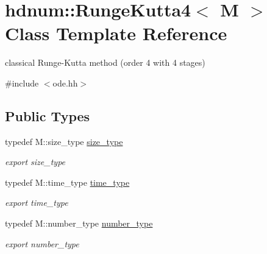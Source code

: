 \hypertarget{classhdnum_1_1RungeKutta4}{
\section{hdnum::RungeKutta4$<$ M $>$ Class Template Reference}
\label{classhdnum_1_1RungeKutta4}
}


classical Runge-\/Kutta method (order 4 with 4 stages)  




{\ttfamily \#include $<$ode.hh$>$}

\subsection*{Public Types}
\begin{DoxyCompactItemize}
\item 
\hypertarget{classhdnum_1_1RungeKutta4_a35c0f2a31327913676b7287fb1ef23dc}{
typedef M::size\_\-type \hyperlink{classhdnum_1_1RungeKutta4_a35c0f2a31327913676b7287fb1ef23dc}{size\_\-type}}
\label{classhdnum_1_1RungeKutta4_a35c0f2a31327913676b7287fb1ef23dc}

\begin{DoxyCompactList}\small\item\em export size\_\-type \item\end{DoxyCompactList}\item 
\hypertarget{classhdnum_1_1RungeKutta4_accd5f055f7a407e0012622fbf4298e84}{
typedef M::time\_\-type \hyperlink{classhdnum_1_1RungeKutta4_accd5f055f7a407e0012622fbf4298e84}{time\_\-type}}
\label{classhdnum_1_1RungeKutta4_accd5f055f7a407e0012622fbf4298e84}

\begin{DoxyCompactList}\small\item\em export time\_\-type \item\end{DoxyCompactList}\item 
\hypertarget{classhdnum_1_1RungeKutta4_a8a2af290f6503769876570bba58fdff2}{
typedef M::number\_\-type \hyperlink{classhdnum_1_1RungeKutta4_a8a2af290f6503769876570bba58fdff2}{number\_\-type}}
\label{classhdnum_1_1RungeKutta4_a8a2af290f6503769876570bba58fdff2}

\begin{DoxyCompactList}\small\item\em export number\_\-type \item\end{DoxyCompactList}\end{DoxyCompactItemize}
